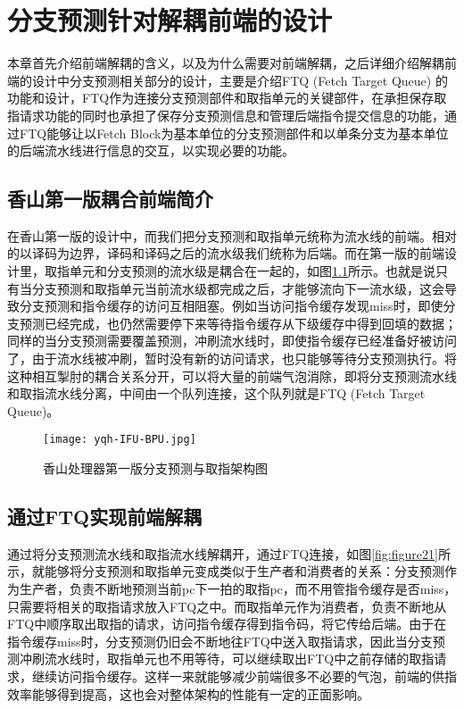 \chapter{分支预测针对解耦前端的设计}

本章首先介绍前端解耦的含义，以及为什么需要对前端解耦，之后详细介绍解耦前端的设计中分支预测相关部分的设计，主要是介绍FTQ (Fetch Target Queue) 的功能和设计，FTQ作为连接分支预测部件和取指单元的关键部件，在承担保存取指请求功能的同时也承担了保存分支预测信息和管理后端指令提交信息的功能，通过FTQ能够让以Fetch Block为基本单位的分支预测部件和以单条分支为基本单位的后端流水线进行信息的交互，以实现必要的功能。

\section{香山第一版耦合前端简介}


在香山第一版的设计中，而我们把分支预测和取指单元统称为流水线的前端。相对的以译码为边界，译码和译码之后的流水级我们统称为后端。而在第一版的前端设计里，取指单元和分支预测的流水级是耦合在一起的，如图\ref{fig:figure41}所示。也就是说只有当分支预测和取指单元当前流水级都完成之后，才能够流向下一流水级，这会导致分支预测和指令缓存的访问互相阻塞。例如当访问指令缓存发现miss时，即使分支预测已经完成，也仍然需要停下来等待指令缓存从下级缓存中得到回填的数据；同样的当分支预测需要覆盖预测，冲刷流水线时，即使指令缓存已经准备好被访问了，由于流水线被冲刷，暂时没有新的访问请求，也只能够等待分支预测执行。将这种相互掣肘的耦合关系分开，可以将大量的前端气泡消除，即将分支预测流水线和取指流水线分离，中间由一个队列连接，这个队列就是FTQ (Fetch Target Queue)。

\begin{figure}[htb]
	\centering
	\setlength\tabcolsep{3pt}  %
	\vspace{5pt} %
	\texttt{[image: yqh-IFU-BPU.jpg]}
	\caption{香山处理器第一版分支预测与取指架构图}
    \label{fig:figure41}
\end{figure}

\section{通过FTQ实现前端解耦}

通过将分支预测流水线和取指流水线解耦开，通过FTQ连接，如图\ref{fig:figure21}所示，就能够将分支预测和取指单元变成类似于生产者和消费者的关系：分支预测作为生产者，负责不断地预测当前pc下一拍的取指pc，而不用管指令缓存是否miss，只需要将相关的取指请求放入FTQ之中。而取指单元作为消费者，负责不断地从FTQ中顺序取出取指的请求，访问指令缓存得到指令码，将它传给后端。由于在指令缓存miss时，分支预测仍旧会不断地往FTQ中送入取指请求，因此当分支预测冲刷流水线时，取指单元也不用等待，可以继续取出FTQ中之前存储的取指请求，继续访问指令缓存。这样一来就能够减少前端很多不必要的气泡，前端的供指效率能够得到提高，这也会对整体架构的性能有一定的正面影响。

